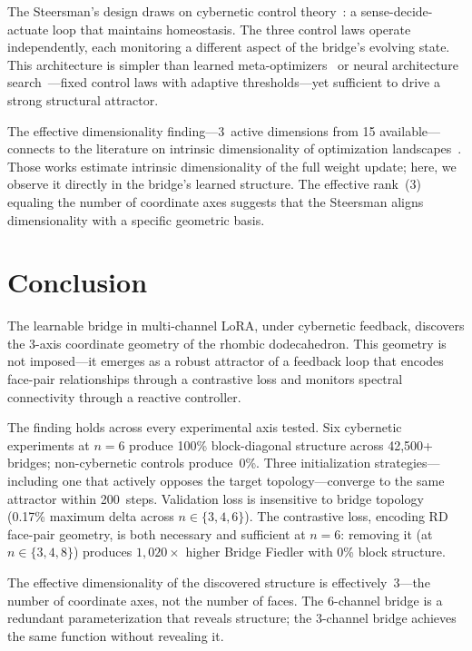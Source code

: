 \documentclass[11pt]{article}
\begin{document}
The Steersman's design draws on cybernetic control
theory~\cite{ashby1956, wiener1948}: a sense-decide-actuate loop that
maintains homeostasis. The three control laws operate independently,
each monitoring a different aspect of the bridge's evolving state.
This architecture is simpler than learned
meta-optimizers~\cite{andrychowicz2016} or neural architecture
search~\cite{zoph2017neural}---fixed control laws with adaptive
thresholds---yet sufficient to drive a strong structural attractor.

The effective dimensionality finding---3~active dimensions from 15
available---connects to the literature on intrinsic dimensionality of
optimization landscapes~\cite{li2018visualizing, aghajanyan2021}.
Those works estimate intrinsic dimensionality of the full weight
update; here, we observe it directly in the bridge's learned
structure. The effective rank~(3) equaling the number of
coordinate axes suggests that the Steersman aligns dimensionality
with a specific geometric basis.


\section{Conclusion}
\label{sec:conclusion}

The learnable bridge in multi-channel LoRA, under cybernetic feedback,
discovers the 3-axis coordinate geometry of the rhombic dodecahedron.
This geometry is not imposed---it emerges as a robust attractor of a
feedback loop that encodes face-pair relationships through a
contrastive loss and monitors spectral connectivity through a reactive
controller.

The finding holds across every experimental axis tested.
Six cybernetic experiments at $n = 6$ produce 100\% block-diagonal
structure across 42{,}500+ bridges; non-cybernetic controls
produce~0\%. Three initialization strategies---including one that
actively opposes the target topology---converge to the same attractor
within 200~steps. Validation loss is insensitive to bridge topology
(0.17\% maximum delta across $n \in \{3, 4, 6\}$). The contrastive
loss, encoding RD face-pair geometry, is both necessary and
sufficient at $n = 6$: removing it (at $n \in \{3, 4, 8\}$) produces
$1{,}020\times$ higher Bridge Fiedler with 0\% block structure.

The effective dimensionality of the discovered structure is
effectively~3---the number of coordinate axes, not the number of faces.
The 6-channel bridge is a redundant parameterization that reveals
structure; the 3-channel bridge achieves the same function without
revealing it.
\end{document}
